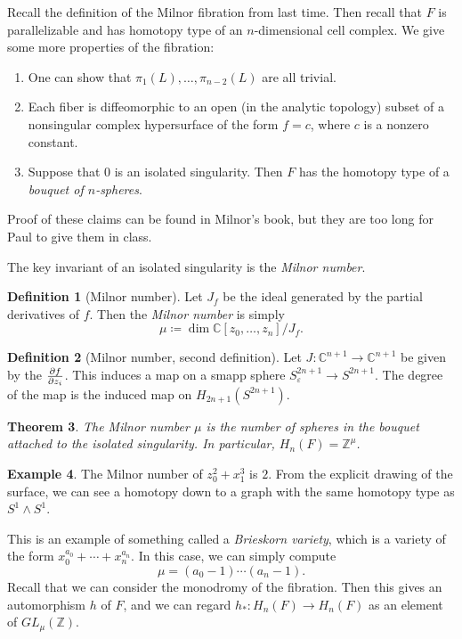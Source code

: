 \documentclass[leqno, openany]{memoir}
\newtheorem{thm}{Theorem}[chapter]
\theoremstyle{definition}
\newtheorem{defn}[thm]{Definition}
\newtheorem{exm}[thm]{Example}
\theoremstyle{remark}
\theoremstyle{plain}
\theoremstyle{definition}
\theoremstyle{remark}
\renewcommand{\C}{\mathbb{C}}
\newcommand{\Z}{\mathbb{Z}}
\newcommand{\ep}{\varepsilon}
\begin{document}
Recall the definition of the Milnor fibration from last time. Then recall that $F$ is parallelizable and has homotopy type of an $n$-dimensional cell complex.
We give some more properties of the fibration:
\begin{enumerate}
    \item One can show that $\pi_1(L), \ldots, \pi_{n-2}(L)$ are all trivial.
    \item Each fiber is diffeomorphic to an open (in the analytic topology) subset of a nonsingular complex hypersurface of the form $f = c$, where $c$ is a nonzero constant.
    \item Suppose that $0$ is an isolated singularity. Then $F$ has the homotopy type of a \textit{bouquet of $n$-spheres}.
\end{enumerate}
Proof of these claims can be found in Milnor's book, but they are too long for Paul to give them in class.

The key invariant of an isolated singularity is the \textit{Milnor number}.
\begin{defn}[Milnor number]
    Let $J_f$ be the ideal generated by the partial derivatives of $f$. Then the \textit{Milnor number} is simply
    \[ \mu \coloneqq \dim \C[z_0, \ldots, z_n]/J_f. \]
\end{defn}

\begin{defn}[Milnor number, second definition]
    Let $J: \C^{n+1} \to \C^{n+1}$ be given by the $\pdv{f}{z_i}$. This induces a map on a smapp sphere $S_{\ep}^{2n+1} \to S^{2n+1}$. The degree of the map is the induced map on $H_{2n+1}(S^{2n+1})$.
\end{defn}

\begin{thm}
    The Milnor number $\mu$ is the number of spheres in the bouquet attached to the isolated singularity. In particular, $H_n(F) = \Z^{\mu}$.
\end{thm}

\begin{exm}
    The Milnor number of $z_0^2 + x_1^3$ is $2$. From the explicit drawing of the surface, we can see a homotopy down to a graph with the same homotopy type as $S^1 \wedge S^1$.
\end{exm}

This is an example of something called a \textit{Brieskorn variety}, which is a variety of the form $x_0^{a_0} + \cdots + x_n^{a_n}$. In this case, we can simply compute
\[ \mu = (a_0 - 1) \cdots (a_n - 1). \]
Recall that we can consider the monodromy of the fibration. Then this gives an automorphism $h$ of $F$, and we can regard $h_*: H_n(F) \to H_n(F)$ as an element of $GL_{\mu}(\Z)$.
\end{document}
